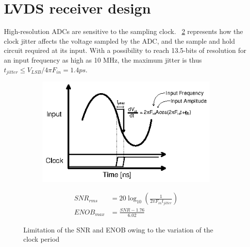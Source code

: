 \section{LVDS receiver design}
High-resolution ADCs are sensitive to the sampling clock. \figurename~\ref{fig:adc-jitter} represents how the clock jitter affects the voltage sampled by the ADC, and the sample and hold circuit required at its input. With a possibility to reach 13.5-bits of resolution for an input frequency as high as 10 MHz, the maximum jitter is thus $t_{jitter} \leq V_{LSB}/4\pi F_{in} = 1.4 ps$. 

\begin{figure}[htp]
    \centering
    \begin{subfigure}[b]{0.48\textwidth}
        \includegraphics[width=\textwidth]{Chapter5/Figs/lvds/aperture_jitter.ps}
        \label{}
    \end{subfigure}
    \begin{subfigure}[b]{0.48\textwidth}
        \begin{align}
            SNR_{rms}  &= 20\log_{10}\left(\frac{1}{2\pi F_{in}t_{jitter}} \right) \\
            ENOB_{max} &= \frac{SNR-1.76}{6.02} 
        \end{align}
        \vspace{2em}
    \end{subfigure}
    \caption{Limitation of the SNR and ENOB owing to the variation of the clock period}
    \label{fig:adc-jitter}
\end{figure}

